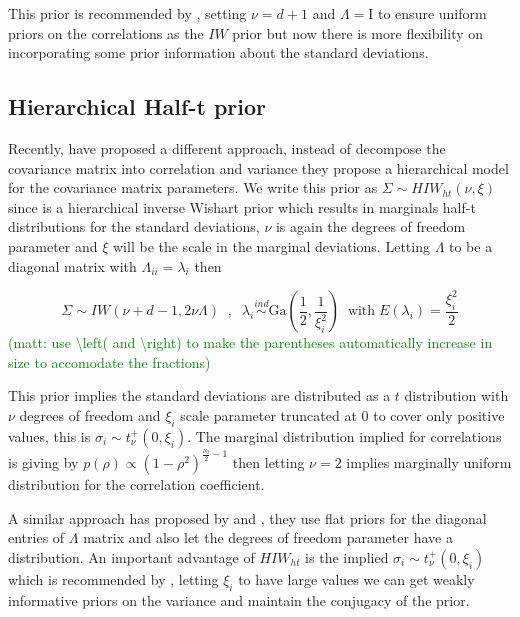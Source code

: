 \documentclass[a4paper]{article}
\newcommand{\matt}[1]{\textcolor{green}{(matt: #1)}}
\newcommand{\I}{\mathrm{I}}
\begin{document}
This prior is recommended by \cite{gelmanhill}, setting $\nu=d+1$ and $\Lambda=\I$ to ensure uniform priors on the correlations as the $IW$ prior but now there is more flexibility on incorporating some prior information about the standard deviations.

\subsection{Hierarchical Half-t prior}

Recently, \cite{huang2013simple} have proposed a different approach, instead of decompose the covariance matrix into correlation and variance they propose a hierarchical model for the covariance matrix parameters. We write this prior as $\Sigma \sim HIW_{ht}(\nu, \xi)$ since is a hierarchical inverse Wishart prior which results in marginals half-t distributions for the standard deviations, $\nu$ is again the degrees of freedom parameter and $\xi$ will be the scale in the marginal deviations.   Letting  $\Lambda$ to be a diagonal matrix with $\Lambda_{ii} =\lambda_i $ then

\begin{equation}
\Sigma \sim IW( \nu + d - 1 ,  2\nu\Lambda) \;\;,\;\;  \lambda_i  \stackrel{ind} \sim \mbox{Ga}(\frac{1}{2} , \frac{1}{\xi_i^2}) \;\; \mbox{with} \; E(\lambda_i)=\frac{\xi_i^2}{2} 
\label{eq:ht}
\end{equation} \matt{ use \textbackslash left( and \textbackslash right) to make the parentheses automatically increase in size to accomodate the fractions}

This prior implies the standard deviations are distributed as a $t$ distribution with $\nu$ degrees of freedom and $\xi_i$ scale parameter truncated at 0 to cover only positive values, this is $\sigma_i \sim t_{\nu}^{+}(0, \xi_i)$.  The marginal distribution implied for correlations is giving by $p(\rho) \propto (1-\rho^2)^{\frac{\nu_0}{2}-1}$ then letting $\nu=2$ implies marginally uniform distribution for the correlation coefficient. 

A similar approach has proposed by \cite{daniels1999} and \cite{matilde}, they use flat priors for the diagonal entries of $\Lambda$ matrix and also let the degrees of freedom parameter have a distribution.  An important advantage of  $HIW_{ht}$ is the implied $\sigma_i \sim t_{\nu}^{+}(0, \xi_i)$ which is recommended by \cite{gelman2006prior}, letting $\xi_i$ to have large values we can get weakly informative priors on the variance and maintain the conjugacy of the prior.  
\end{document}
